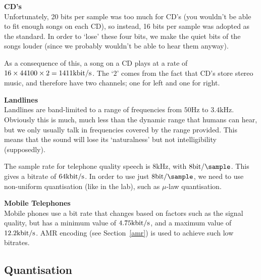 \begin{description}

  \item \textbf{CD's}\\
  Unfortunately, 20 bits per sample was too much for CD's (you wouldn't be able
  to fit enough songs on each CD), so instead, 16 bits per sample was adopted
  as the standard. In order to `lose' these four bits, we make the quiet bits
  of the songs louder (since we probably wouldn't be able to hear them anyway).

  As a consequence of this, a song on a CD plays at a rate of $16 \times 44100
  \times 2 = 1411\si{\kilo\bit\per\second}$. The `$2$' comes from the fact that
  CD's store stereo music, and therefore have two channels; one for left and
  one for right.

  \item \textbf{Landlines}\\
  Landlines are band-limited to a range of frequencies from $50\si{\hertz}$ to
  $3.4\si{\kilo\hertz}$. Obviously this is much, much less than the dynamic
  range that humans can hear, but we only usually talk in frequencies covered by
  the range provided. This means that the sound will lose its `naturalness' but
  not intelligibility (supposedly).


  The sample rate for telephone quality speech is $8\si{\kilo\hertz}$, with
  $8\si{\bit\per\sample}$. This gives a bitrate of
  $64\si{\kilo\bit\per\second}$. In order to use just $8\si{\bit\per\sample}$,
  we need to use non-uniform quantisation (like in the lab), such as $\mu$-law
  quantisation.

  \item \textbf{Mobile Telephones}\\
  Mobile phones use a bit rate that changes based on factors such as the signal
  quality, but has a minimum value of $4.75\si{\kilo\bit\per\second}$, and a
  maximum value of $12.2\si{\kilo\bit\per\second}$. AMR encoding (see
  Section~\ref{amr}) is used to achieve such low bitrates.

\end{description}

\subsection{Quantisation}

